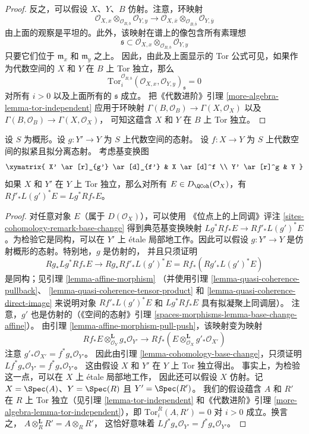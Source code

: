 \begin{proof}
\medskip\noindent
反之，可以假设 $X$、$Y$、$B$ 仿射。注意，环映射
$$
\mathcal{O}_{X, x} \otimes_{\mathcal{O}_{B, b}} \mathcal{O}_{Y, y}
\longrightarrow
\mathcal{O}_{X, \overline{x}} \otimes_{\mathcal{O}_{B, \overline{b}}}
\mathcal{O}_{Y, \overline y}
$$
由上面的观察是平坦的。此外，该映射在谱上的像包含所有素理想
$$
\mathfrak s \subset
\mathcal{O}_{X, x} \otimes_{\mathcal{O}_{B, b}} \mathcal{O}_{Y, y}
$$
只要它们位于 $\mathfrak m_x$ 和 $\mathfrak m_y$ 之上。
因此，由此及上面显示的 Tor 公式可见，如果作为代数空间的
$X$ 和 $Y$ 在 $B$ 上 Tor 独立，那么
$$
\text{Tor}_i^{\mathcal{O}_{B, b}}
(\mathcal{O}_{X, x}, \mathcal{O}_{Y, y})_\mathfrak s = 0
$$
对所有 $i > 0$ 以及上面所有的 $\mathfrak s$ 成立。
把《代数进阶》引理
\ref{more-algebra-lemma-tor-independent} 应用于环映射
$\Gamma(B, \mathcal{O}_B) \to \Gamma(X, \mathcal{O}_X)$
以及
$\Gamma(B, \mathcal{O}_B) \to \Gamma(X, \mathcal{O}_X)$，%
可知这蕴含 $X$ 和 $Y$ 在 $B$ 上 Tor 独立。
\end{proof}

\begin{lemma}
\label{lemma-compare-base-change}
设 $S$ 为概形。设 $g : Y' \to Y$ 为 $S$ 上代数空间的态射。
设 $f : X \to Y$ 为 $S$ 上代数空间的拟紧且拟分离态射。
考虑基变换图
$$
\xymatrix{
X' \ar[r]_{g'} \ar[d]_{f'} &
X \ar[d]^f \\
Y' \ar[r]^g &
Y
}
$$
如果 $X$ 和 $Y'$ 在 $Y$ 上 Tor 独立，那么对所有
$E \in D_\QCoh(\mathcal{O}_X)$，有
$Rf'_*L(g')^*E = Lg^*Rf_*E$。
\end{lemma}

\begin{proof}
对任意对象 $E$（属于 $D(\mathcal{O}_X)$），可以使用
《位点上的上同调》评注
\ref{sites-cohomology-remark-base-change} 得到典范基变换映射
$Lg^*Rf_*E \to Rf'_*L(g')^*E$。为检验它是同构，可以在
$Y'$ 上 \'etale 局部地工作。因此可以假设
$g : Y' \to Y$ 是仿射概形的态射。特别地，$g$ 是仿射的，
并且只须证明
$$
Rg_*Lg^*Rf_*E \to Rg_*Rf'_*L(g')^*E = Rf_*(Rg'_* L(g')^* E)
$$
是同构；见引理 \ref{lemma-affine-morphism}
（并使用引理 \ref{lemma-quasi-coherence-pullback}、
\ref{lemma-quasi-coherence-tensor-product} 和
\ref{lemma-quasi-coherence-direct-image} 来说明对象
$Rf'_*L(g')^*E$ 和 $Lg^*Rf_*E$ 具有拟凝聚上同调层）。
注意，$g'$ 也是仿射的（《空间的态射》引理
\ref{spaces-morphisms-lemma-base-change-affine}）。
由引理 \ref{lemma-affine-morphism-pull-push}，该映射变为映射
$$
Rf_*E \otimes_{\mathcal{O}_Y}^\mathbf{L} g_*\mathcal{O}_{Y'}
\longrightarrow
Rf_*(E \otimes_{\mathcal{O}_X}^\mathbf{L} g'_*\mathcal{O}_{X'})
$$
注意 $g'_*\mathcal{O}_{X'} = f^*g_*\mathcal{O}_{Y'}$。
因此由引理 \ref{lemma-cohomology-base-change}，只须证明
$Lf^*g_*\mathcal{O}_{Y'} = f^*g_*\mathcal{O}_{Y'}$。
这由假设 $X$ 和 $Y'$ 在 $Y$ 上 Tor 独立得出。
事实上，为检验这一点，可以在 $X$ 上 \'etale 局部地工作，
因此还可以假设 $X$ 仿射。记
$X = \Spec(A)$、$Y = \Spec(R)$ 且 $Y' = \Spec(R')$。
我们的假设蕴含 $A$ 和 $R'$ 在 $R$ 上 Tor 独立（见引理
\ref{lemma-tor-independent} 和《代数进阶》引理
\ref{more-algebra-lemma-tor-independent}），即
$\text{Tor}_i^R(A, R') = 0$ 对 $i > 0$ 成立。换言之，
$A \otimes_R^\mathbf{L} R' = A \otimes_R R'$，
这恰好意味着
$Lf^*g_*\mathcal{O}_{Y'} = f^*g_*\mathcal{O}_{Y'}$。
\end{proof}


